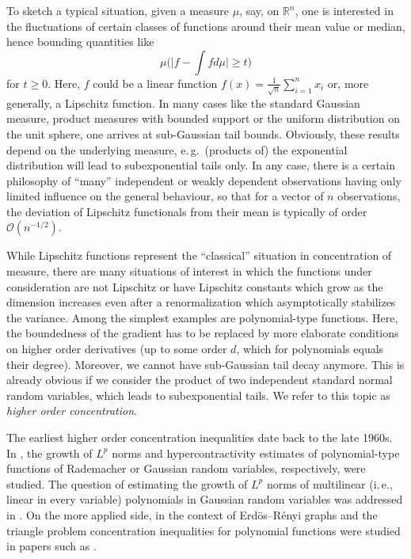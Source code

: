 \documentclass[a4paper,12pt]{amsart}
\numberwithin{equation}{section}
\theoremstyle{remark}
\def\R{{\mathbb R}}
\begin{document}
To sketch a typical situation, given a measure $\mu$, say, on $\R^n$, one is interested in the fluctuations of certain classes of functions around their mean value or median, hence bounding quantities like
\[
\mu\Big(\Big|f - \int f d\mu\Big| \ge t\Big)
\]
for $t \ge 0$. Here, $f$ could be a linear function $f(x) = \frac{1}{\sqrt{n}} \sum_{i=1}^n x_i$ or, more generally, a Lipschitz function. In many cases like the standard Gaussian measure, product measures with bounded support or the uniform distribution on the unit sphere, one arrives at sub-Gaussian tail bounds. Obviously, these results depend on the underlying measure, e.\,g.\ (products of) the exponential distribution will lead to subexponential tails only. In any case, there is a certain philosophy of ``many'' independent or weakly dependent observations having only limited influence on the general behaviour, so that for a vector of $n$ observations, the deviation of Lipschitz functionals from their mean is typically of order $\mathcal{O}(n^{-1/2})$.

While Lipschitz functions represent the ``classical'' situation in concentration of measure, there are many situations of interest in which the functions under consideration are not Lipschitz or have Lipschitz constants which grow as the dimension increases even after a renormalization which asymptotically stabilizes the variance. Among the simplest examples are polynomial-type functions. Here, the boundedness of the gradient has to be replaced by more elaborate conditions on higher order derivatives (up to some order $d$, which for polynomials equals their degree). Moreover, we cannot have sub-Gaussian tail decay anymore. This is already obvious if we consider the product of two independent standard normal random variables, which leads to subexponential tails. We refer to this topic as \emph{higher order concentration}.

The earliest higher order concentration inequalities date back to the late 1960s. In \cite{Bon68,Bon70,Nel73}, the growth of $L^p$ norms and hypercontractivity estimates of polynomial-type functions of Rademacher or Gaussian random variables, respectively, were studied. The question of estimating the growth of $L^p$ norms of multilinear (i.\,e., linear in every variable) polynomials in Gaussian random variables was addressed in \cite{Bor84,AG93,Lat06}. On the more applied side, in the context of Erd{\"o}s--R{\'e}nyi graphs and the triangle problem concentration inequalities for polynomial functions were studied in papers such as \cite{KV00}.
\end{document}
